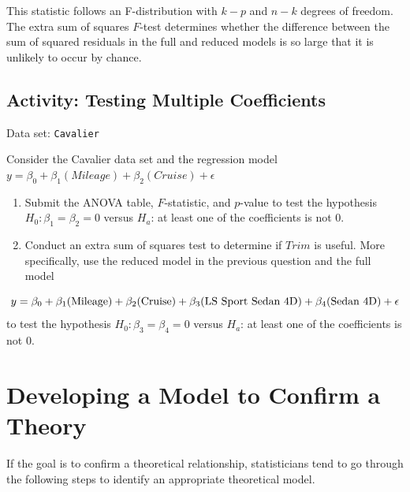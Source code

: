 \documentclass[
]{book}
\begin{document}
This statistic follows an F-distribution with \(k-p\) and \(n-k\) degrees of freedom. The extra sum of squares \(F\)-test determines whether the difference between the sum of squared residuals in the full and reduced models is so large that it is unlikely to occur by chance.

\hypertarget{activity-testing-multiple-coefficients}{%
\subsection*{Activity: Testing Multiple Coefficients}\label{activity-testing-multiple-coefficients}}

Data set: \texttt{Cavalier}

Consider the Cavalier data set and the regression model \(y = \beta_0 + \beta_1(Mileage) + \beta_2(Cruise) + \epsilon\)

\begin{enumerate}
\def\labelenumi{\arabic{enumi}.}
\setcounter{enumi}{29}
\item
  Submit the ANOVA table, \(F\)-statistic, and \(p\)-value to test the hypothesis \(H_0: \beta_1 = \beta_2 = 0\) versus \(H_a\): at least one of the coefficients is not 0.
\item
  Conduct an extra sum of squares test to determine if \(Trim\) is useful. More specifically, use the reduced model in the previous question and the full model
\end{enumerate}

\begin{equation}
y = \beta_0 + \beta_1(\text{Mileage}) + \beta_2(\text{Cruise}) + \beta_3(\text{LS Sport Sedan 4D}) + \beta_4(\text{Sedan 4D}) + \epsilon \notag
\end{equation}
to test the hypothesis \(H_0: \beta_3 = \beta_4 = 0\) versus \(H_a\): at least one of the coefficients is not 0.

\hypertarget{developing-a-model-to-confirm-a-theory}{%
\section{Developing a Model to Confirm a Theory}\label{developing-a-model-to-confirm-a-theory}}

If the goal is to confirm a theoretical relationship, statisticians tend to go through the following steps to identify an appropriate theoretical model.
\end{document}
